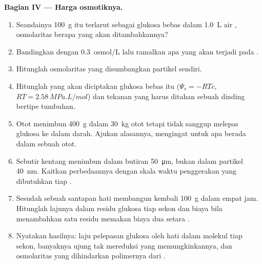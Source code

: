 \begin{problem}
\medskip
\noindent\textbf{Bagian IV --- Harga osmotiknya.}
\begin{enumerate}[resume]
  \item Seandainya \qty{100}{g} itu terlarut sebagai glukosa bebas
        dalam \qty{1.0}{L} air , osmolaritas berapa yang akan
        ditambahkannya?
  \item Bandingkan dengan \qty{0.3}{osmol/L}  lalu ramalkan
        apa yang akan terjadi pada .
  \item Hitunglah osmolaritas yang disumbangkan partikel 
        sendiri.
  \item Hitunglah  yang akan diciptakan glukosa bebas itu
        ($\Psi_s = -RTc$, $RT = \qty{2.58}{MPa.L/mol}$) dan tekanan yang
        harus ditahan sebuah dinding bertipe tumbuhan.
  \item Otot menimbun \qty{400}{g}  dalam \qty{30}{kg} otot
        tetapi tidak sanggup melepas glukosa ke dalam darah. Ajukan
        alasannya, mengingat untuk apa  berada dalam sebuah otot.
  \item Sebutir kentang menimbun  dalam butiran \qty{50}{\micro m},
        bukan dalam partikel  \qty{40}{nm}. Kaitkan
        perbedaannya dengan skala waktu penggerakan yang dibutuhkan tiap
        .
  \item Sesudah sebuah santapan hati membangun kembali \qty{100}{g}
         dalam empat jam. Hitunglah lajunya dalam residu
        glukosa tiap sekon dan biaya  bila menambahkan satu
        residu memakan biaya dua setara .
  \item Nyatakan hasilnya: laju pelepasan glukosa oleh hati dalam
        molekul tiap sekon, banyaknya ujung tak mereduksi yang
        memungkinkannya, dan osmolaritas yang dihindarkan polimernya
        dari .
\end{enumerate}
\end{problem}
